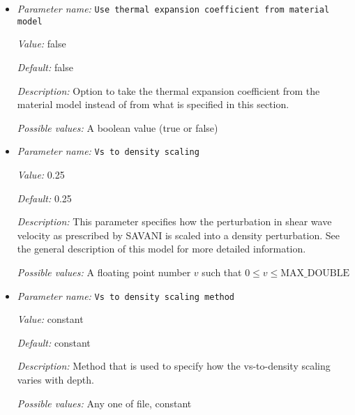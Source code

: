 \begin{itemize}
{\it Default:} 2e-5


{\it Description:} The value of the thermal expansion coefficient $\beta$. Units: $1/K$.


{\it Possible values:} A floating point number $v$ such that $0 \leq v \leq \text{MAX\_DOUBLE}$
\item {\it Parameter name:} {\tt Use thermal expansion coefficient from material model}
\label{parameters:Initial temperature model/SAVANI perturbation/Use thermal expansion coefficient from material model}
\label{parameters:Initial_20temperature_20model/SAVANI_20perturbation/Use_20thermal_20expansion_20coefficient_20from_20material_20model}


{\it Value:} false


{\it Default:} false


{\it Description:} Option to take the thermal expansion coefficient from the material model instead of from what is specified in this section.


{\it Possible values:} A boolean value (true or false)
\item {\it Parameter name:} {\tt Vs to density scaling}
\label{parameters:Initial temperature model/SAVANI perturbation/Vs to density scaling}
\label{parameters:Initial_20temperature_20model/SAVANI_20perturbation/Vs_20to_20density_20scaling}


{\it Value:} 0.25


{\it Default:} 0.25


{\it Description:} This parameter specifies how the perturbation in shear wave velocity as prescribed by SAVANI is scaled into a density perturbation. See the general description of this model for more detailed information.


{\it Possible values:} A floating point number $v$ such that $0 \leq v \leq \text{MAX\_DOUBLE}$
\item {\it Parameter name:} {\tt Vs to density scaling method}
\label{parameters:Initial temperature model/SAVANI perturbation/Vs to density scaling method}
\label{parameters:Initial_20temperature_20model/SAVANI_20perturbation/Vs_20to_20density_20scaling_20method}


{\it Value:} constant


{\it Default:} constant


{\it Description:} Method that is used to specify how the vs-to-density scaling varies with depth.


{\it Possible values:} Any one of file, constant
\end{itemize}




